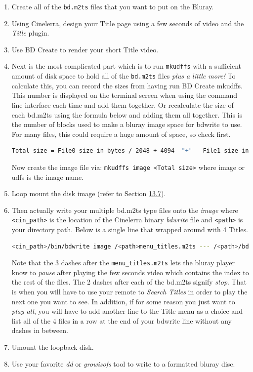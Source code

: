 \begin{enumerate}
    \item Create all of the \texttt{bd.m2ts} files that you want to put on the Bluray.
    \item Using Cinelerra, design your Title page using a few seconds of video and the \textit{Title} plugin.
    \item Use BD Create to render your short Title video.
    \item Next is the most complicated part which is to run \texttt{mkudffs} with a sufficient amount of disk space to hold all of the \texttt{bd.m2ts} files \textit{plus a little more!}  To calculate this, you can record the sizes from having run BD Create mkudffs.  This number is displayed on the terminal screen when using the command line interface each time and add them together.  Or recalculate the size of each bd.m2ts using the formula below and adding them all together.  This is the number of blocks used to make a bluray image space for bdwrite to use.  For many files, this could require a huge amount of space, so check first.
    \begin{lstlisting}[language=bash,numbers=none]
    Total size = File0 size in bytes / 2048 + 4094  "+"   File1 size in bytes / 2048 + 4094  "+" ...
    \end{lstlisting}
    Now create the image file via:   \texttt{mkudffs image <Total size>}  where image or udfs is the image name.
    \item Loop mount the disk image (refer to Section \hyperref[sec:bluray_workaround_mount_umount]{13.7}).
    \item Then actually write your multiple bd.m2ts type files onto the \textit{image} where \texttt{<cin\_path>} is the location of the Cinelerra binary \textit{bdwrite} file and \texttt{<path>} is your directory path.  Below is a single line that wrapped around with 4 Titles.
    \begin{lstlisting}[language=bash,numbers=none]
    <cin_path>/bin/bdwrite image /<path>menu_titles.m2ts --- /<path>/bd1.m2ts -- /<path>/bd2.m2ts -- /<path>/bd3.m2ts -- /<path>bd4.m2ts
    \end{lstlisting}
    Note that the 3 dashes after the \texttt{menu\_titles.m2ts} lets the bluray player know to \textit{pause} after playing the few seconds video which contains the index to the rest of the files.  The 2 dashes after each of the bd.m2ts signify \textit{stop}.  That is when you will have to use your remote to \textit{Search Titles} in order to play the next one you want to see.  In addition, if for some reason you just want to \textit{play all}, you will have to add another line to the Title menu as a choice and list all of the 4 files in a row at the end of your bdwrite line without any dashes in between.
    \item Umount the loopback disk.
    \item Use your favorite \textit{dd} or \textit{growisofs} tool to write to a formatted bluray disc.
\end{enumerate}

